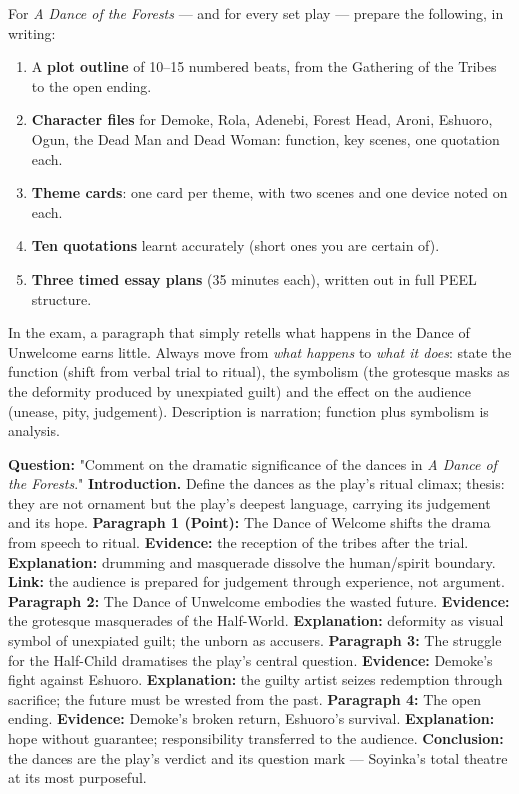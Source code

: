 \documentclass[11pt]{article}
\begin{document}
\begin{methode}
For \emph{A Dance of the Forests} — and for every set play — prepare the following, in writing:
\begin{enumerate}
\item A \textbf{plot outline} of 10--15 numbered beats, from the Gathering of the Tribes to the open ending.
\item \textbf{Character files} for Demoke, Rola, Adenebi, Forest Head, Aroni, Eshuoro, Ogun, the Dead Man and Dead Woman: function, key scenes, one quotation each.
\item \textbf{Theme cards}: one card per theme, with two scenes and one device noted on each.
\item \textbf{Ten quotations} learnt accurately (short ones you are certain of).
\item \textbf{Three timed essay plans} (35 minutes each), written out in full PEEL structure.
\end{enumerate}
\end{methode}

\begin{attention}
In the exam, a paragraph that simply retells what happens in the Dance of Unwelcome earns little. Always move from \emph{what happens} to \emph{what it does}: state the function (shift from verbal trial to ritual), the symbolism (the grotesque masks as the deformity produced by unexpiated guilt) and the effect on the audience (unease, pity, judgement). Description is narration; function plus symbolism is analysis.
\end{attention}

\begin{exoresolu}
\textbf{Question:} "Comment on the dramatic significance of the dances in \emph{A Dance of the Forests}."
\tcblower
\textbf{Introduction.} Define the dances as the play's ritual climax; thesis: they are not ornament but the play's deepest language, carrying its judgement and its hope.
\textbf{Paragraph 1 (Point):} The Dance of Welcome shifts the drama from speech to ritual. \textbf{Evidence:} the reception of the tribes after the trial. \textbf{Explanation:} drumming and masquerade dissolve the human/spirit boundary. \textbf{Link:} the audience is prepared for judgement through experience, not argument.
\textbf{Paragraph 2:} The Dance of Unwelcome embodies the wasted future. \textbf{Evidence:} the grotesque masquerades of the Half-World. \textbf{Explanation:} deformity as visual symbol of unexpiated guilt; the unborn as accusers.
\textbf{Paragraph 3:} The struggle for the Half-Child dramatises the play's central question. \textbf{Evidence:} Demoke's fight against Eshuoro. \textbf{Explanation:} the guilty artist seizes redemption through sacrifice; the future must be wrested from the past.
\textbf{Paragraph 4:} The open ending. \textbf{Evidence:} Demoke's broken return, Eshuoro's survival. \textbf{Explanation:} hope without guarantee; responsibility transferred to the audience.
\textbf{Conclusion:} the dances are the play's verdict and its question mark — Soyinka's total theatre at its most purposeful.
\end{exoresolu}
\end{document}
